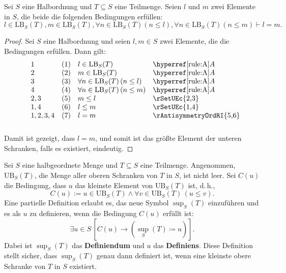 \documentclass[main.tex]{subfiles}
\begin{document}
\label{lInLBwmInLBwFanInLBLpnLeqlRpwFanInLBLpnLeqmRpImplEqualsm}
\begin{theorem}
    Sei \( S \) eine Halbordnung und \( T \subseteq S \) eine Teilmenge. Seien \( l \) und \( m \) zwei Elemente in \( S \), die beide die folgenden Bedingungen erfüllen:
    \[
    l \in \text{LB}_S(T), m \in \text{LB}_S(T), \forall n \in \text{LB}_S(T) (n \leq l), \forall n \in \text{LB}_S(T) (n \leq m) \vdash l = m.
    \]
\end{theorem}

\begin{proof}
    Sei \( S \) eine Halbordnung und seien \( l, m \in S \) zwei Elemente, die die Bedingungen erfüllen. Dann gilt:
    \[
    \begin{array}{lll p{4cm}}
        1 & (1) & l \in \text{LB}_S(T) & \rA \\
        2 & (2) & m \in \text{LB}_S(T) & \rA \\
        3 & (3) & \forall n \in \text{LB}_S(T) \, (n \leq l) & \rA \\
        4 & (4) & \forall n \in \text{LB}_S(T) \, (n \leq m) & \rA \\
        2,3 & (5) & m \leq l & \rSetUEc{2,3}  \\
        1,4 & (6) & l \leq m & \rSetUEc{1,4} \\
        1,2,3,4 & (7) & l = m & \rAntisymmetryOrdRI{5,6} \\
    \end{array}
    \]
    Damit ist gezeigt, dass \( l = m \), und somit ist das größte Element der unteren Schranken, falls es existiert, eindeutig.
\end{proof}


\begin{definition}[Supremum]
    Sei \( S \) eine halbgeordnete Menge und \( T \subseteq S \) eine Teilmenge. Angenommen, \(\text{UB}_S(T)\), die Menge aller oberen Schranken von \( T \) in \( S \), ist nicht leer. Sei \( C(u) \) die Bedingung, dass \( u \) das kleinste Element von \(\text{UB}_S(T)\) ist, d.\,h.,
    \[
    C(u) := u \in \text{UB}_S(T) \land \forall v \in \text{UB}_S(T) \, (u \leq v).
    \]
    Eine partielle Definition erlaubt es, das neue Symbol \(\sup_S(T)\) einzuführen und es als \( u \) zu definieren, wenn die Bedingung \( C(u) \) erfüllt ist:
    \[
    \exists u \in S \, [ C(u) \rightarrow (\sup_S(T) \coloneqq u) ].
    \]
    Dabei ist \(\sup_S(T)\) das \textbf{Definiendum} und \( u \) das \textbf{Definiens}. Diese Definition stellt sicher, dass \(\sup_S(T)\) genau dann definiert ist, wenn eine kleinste obere Schranke von \( T \) in \( S \) existiert.
\end{definition}
\end{document}
